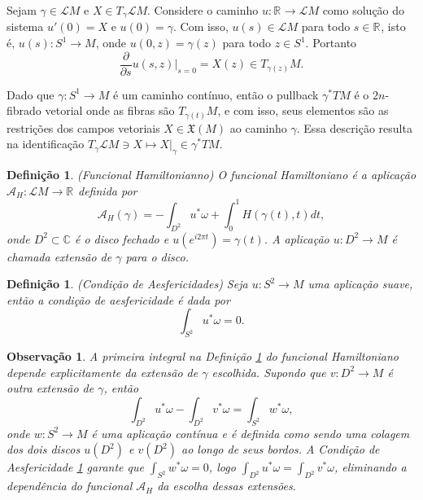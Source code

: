 \documentclass[12pt]{book}
\newtheorem{definicao}[teorema]{Definição}
\newtheorem{observacao}[teorema]{Observação}
\newcommand{\campossuaves}[1]{\mathfrak{X}(#1)}
\newcommand{\circulo}{S^{1}}
\newcommand{\derivadaparcial}[2]{\frac{\partial #1}{\partial #2}}
\newcommand{\espacotangenteponto}[2]{T_{#1}#2}
\newcommand{\funcionalH}{\mathcal{A}_{H}}
\newcommand{\funcionalHponto}[1]{\mathcal{A}_{H}(#1)}
\newcommand{\pullbackfibradotangente}[2]{#1^{*}T#2}
\newcommand{\real}[1]{\mathbb{R}^{#1}}
\newcommand{\reta}{\real{}}
\newcommand{\lacocontrateis}{\mathcal{L}M}
\begin{document}
	Sejam $\gamma \in \lacocontrateis$ e $X \in \espacotangenteponto{\gamma}{\lacocontrateis}$. Considere o caminho $u : \reta \to \lacocontrateis$ como solução do sistema $u'(0)=X $ e $u(0) = \gamma$. Com isso, $u(s)\in \lacocontrateis$ para todo $s\in \reta$, isto é, $u(s):\circulo\to M$, onde $u(0,z) = \gamma(z)$ para todo $z\in \circulo$. Portanto
	$$
	\derivadaparcial{}{s}u(s,z)|_{s=0}=X(z) \in \espacotangenteponto{\gamma(z)}{M}.
	$$
	
	
	Dado que $\gamma:\circulo\to M$ é um caminho contínuo, então o pullback $\gamma^{*}TM$ é o $2n$-fibrado vetorial onde as fibras são $\espacotangenteponto{\gamma(t)}{M}$, e com isso, seus elementos são as restrições dos campos vetoriais $X \in \campossuaves{M}$ ao caminho $\gamma$. Essa descrição resulta na identificação $\espacotangenteponto{\gamma}{\lacocontrateis} \ni X \mapsto  X|_{\gamma} \in \pullbackfibradotangente{\gamma}{M}$. 
	\begin{definicao}\label{definicao_funcional_hamiltoniano}
		(Funcional Hamiltonianno) O funcional Hamiltoniano é a aplicação $\funcionalH: \lacocontrateis\to \reta$ definida por
		$$
		\funcionalHponto{\gamma} = -\int_{D^{2}}u^{*}\omega + \int_{0}^{1}H(\gamma(t), t)dt,
		$$
		onde $D^{2} \subset \mathbb{C}$ é o disco fechado e $u(e^{i2\pi t})=\gamma(t)$. A aplicação $u:D^{2}\to M$ é chamada extensão de $\gamma$ para o disco.
	\end{definicao}
	
	\begin{definicao}\label{definicao_condicao_aesfericidade}
		(Condição de Aesfericidades) Seja $u:S^{2} \to M$ uma aplicação suave, então a condição de aesfericidade é dada por 
		$$
		\int_{S^{2}} u^{*}\omega = 0.
		$$
	\end{definicao}
	
	\begin{observacao}
		A primeira integral na Definição \ref{definicao_funcional_hamiltoniano} do funcional Hamiltoniano depende explicitamente da extensão de $\gamma$ escolhida. Supondo que $v : D^{2}\to M$ é outra extensão de $\gamma$, então
		$$
		\int_{D^{2}}u^{*}\omega - \int_{D^{2}}v^{*}\omega  = \int_{S^{2}}w^{*}\omega, 
		$$
		onde $w:S^{2} \to M$ é uma aplicação contínua e é definida como sendo uma colagem dos dois discos $u(D^{2})$ e $v(D^{2})$ ao longo de seus bordos. A Condição de Aesfericidade \ref{definicao_condicao_aesfericidade} garante que $\int_{S^{2}}w^{*}\omega=0$, logo $\int_{D^{2}}u^{*}\omega = \int_{D^{2}}v^{*}\omega$, eliminando a dependência do funcional $\funcionalH$ da escolha dessas extensões.
	\end{observacao}
	
\end{document}
